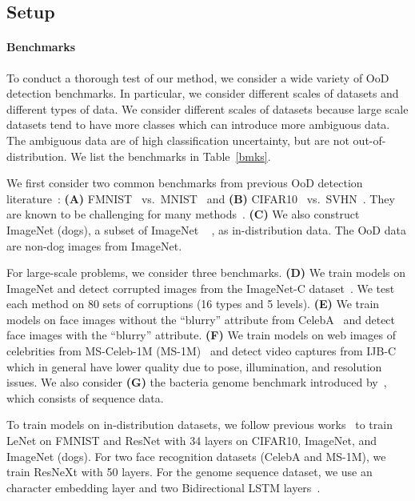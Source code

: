 \documentclass[letterpaper]{article}
\begin{document}
\subsection{Setup}

\paragraph{Benchmarks}
To conduct a thorough test of our method, we consider a wide variety of OoD detection benchmarks. In particular, we consider different scales of datasets and different types of data.
We consider different scales of datasets because large scale datasets tend to have more classes which can introduce more ambiguous data. The ambiguous data are of high classification uncertainty, but are not out-of-distribution.
We list the benchmarks in Table~\ref{bmks}. 

We first consider two common benchmarks from previous OoD detection literature~\cite{duq, ren2019likelihood}: \textbf{(A)} FMNIST~\cite{fmnist} vs.\ MNIST~\cite{mnist} and \textbf{(B)} CIFAR10~\cite{cifar10} vs.\ SVHN~\cite{svhn}.
They are known to be challenging for many methods~\cite{ren2019likelihood, generative_know}.
\textbf{(C)} We also construct ImageNet (dogs), a subset of ImageNet ~\cite{imagenet} , as in-distribution data. 
The OoD data are non-dog images from ImageNet.

For large-scale problems, we consider three benchmarks.
\textbf{(D)} We train models on ImageNet and detect corrupted  images from the ImageNet-C dataset~\cite{corruption}.
We test each method on 80 sets of corruptions (16 types and 5 levels).
\textbf{(E)} 
We train models on face images without the ``blurry'' attribute from CelebA~\cite{celeba} and detect face images with the ``blurry'' attribute.
\textbf{(F)} We train models on web images of celebrities from MS-Celeb-1M (MS-1M)~\cite{ms1m} and detect video captures from IJB-C~\cite{ijbc} which in general have lower quality due to pose, illumination, and resolution issues.
We also consider \textbf{(G)} the bacteria genome benchmark introduced by~\cite{ren2019likelihood}, which consists of sequence data.

To train models on  in-distribution datasets, we follow previous works~\cite{mahalanobis} to train LeNet on FMNIST and ResNet with 34 layers on CIFAR10, ImageNet, and ImageNet (dogs).
For two face recognition datasets (CelebA and MS-1M), we train ResNeXt with 50 layers.
For the genome sequence dataset, we use an character embedding layer and two Bidirectional LSTM layers~\cite{bilstm}.
\end{document}
